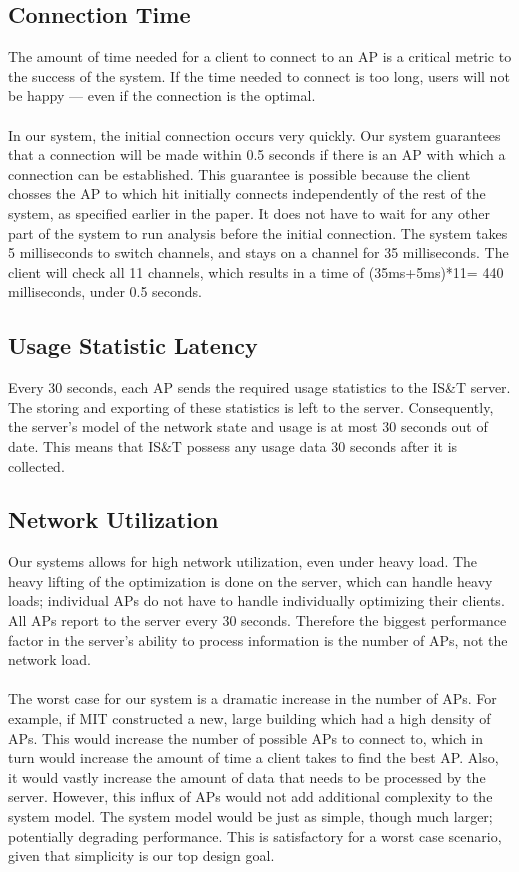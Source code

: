 \documentclass[10pt,journal,compsoc]{IEEEtran}
\begin{document}
		\subsection{Connection Time}
		The amount of time needed for a client to connect to an AP is a critical metric to the success of the system. If the time needed to connect is too long, users will not be happy --- even if the connection is the optimal.\\
		\\
		In our system, the initial connection occurs very quickly. Our system guarantees that a connection will be made within 0.5 seconds if there is an AP with which a connection can be established. This guarantee is possible because the client chosses the AP to which hit initially connects independently of the rest of the system, as specified earlier in the paper. It does not have to wait for any other part of the system to run analysis before the initial connection. The system takes 5 milliseconds to switch channels, and stays on a channel for 35 milliseconds. The client will check all 11 channels, which results in a time of (35ms+5ms)*11= 440 milliseconds, under 0.5 seconds.
		
		\subsection{Usage Statistic Latency}
		Every 30 seconds, each AP sends the required usage statistics to the IS\&T server. The storing and exporting of these statistics is left to the server. Consequently, the server's model of the network state and usage is at most 30 seconds out of date. This means that IS\&T possess any usage data 30 seconds after it is collected.
		
		\subsection{Network Utilization}
		Our systems allows for high network utilization, even under heavy load. The heavy lifting of the optimization is done on the server, which can handle heavy loads; individual APs do not have to handle individually optimizing their clients. All APs report to the server every 30 seconds. Therefore the biggest performance factor in the server's ability to process information is the number of APs, not the network load.\\
		\\
		The worst case for our system is a dramatic increase in the number of APs. For example, if MIT constructed a new, large building which had a high density of APs. This would increase the number of possible APs to connect to, which in turn would increase the amount of time a client takes to find the best AP. Also, it would vastly increase the amount of data that needs to be processed by the server. However, this influx of APs would not add additional complexity to the system model. The system model would be just as simple, though much larger; potentially degrading performance. This is satisfactory for a worst case scenario, given that simplicity is our top design goal.
		
\end{document}
